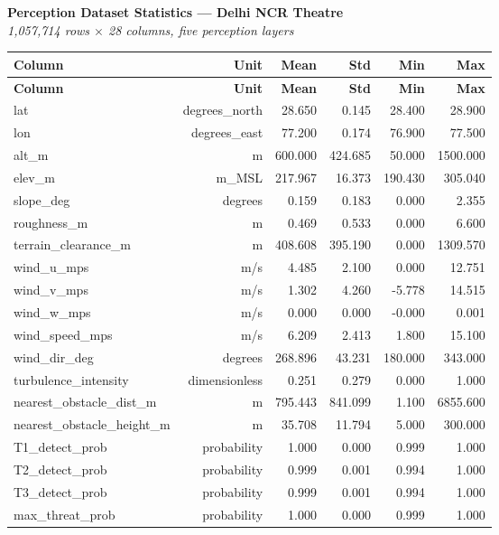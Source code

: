 \documentclass{article}
\begin{document}
\begin{center}
\textbf{Perception Dataset Statistics — Delhi NCR Theatre}\\
\textit{1,057,714 rows $\times$ 28 columns, five perception layers}
\end{center}

\begin{longtable}{lrrrrr}
\toprule
\textbf{Column} & \textbf{Unit} & \textbf{Mean} & \textbf{Std} & \textbf{Min} & \textbf{Max} \\
\midrule
\endfirsthead
\toprule
\textbf{Column} & \textbf{Unit} & \textbf{Mean} & \textbf{Std} & \textbf{Min} & \textbf{Max} \\
\midrule
\endhead
\bottomrule
\endfoot
lat & degrees_north & 28.650 & 0.145 & 28.400 & 28.900 \\
lon & degrees_east & 77.200 & 0.174 & 76.900 & 77.500 \\
alt\_m & m & 600.000 & 424.685 & 50.000 & 1500.000 \\
elev\_m & m_MSL & 217.967 & 16.373 & 190.430 & 305.040 \\
slope\_deg & degrees & 0.159 & 0.183 & 0.000 & 2.355 \\
roughness\_m & m & 0.469 & 0.533 & 0.000 & 6.600 \\
terrain\_clearance\_m & m & 408.608 & 395.190 & 0.000 & 1309.570 \\
wind\_u\_mps & m/s & 4.485 & 2.100 & 0.000 & 12.751 \\
wind\_v\_mps & m/s & 1.302 & 4.260 & -5.778 & 14.515 \\
wind\_w\_mps & m/s & 0.000 & 0.000 & -0.000 & 0.001 \\
wind\_speed\_mps & m/s & 6.209 & 2.413 & 1.800 & 15.100 \\
wind\_dir\_deg & degrees & 268.896 & 43.231 & 180.000 & 343.000 \\
turbulence\_intensity & dimensionless & 0.251 & 0.279 & 0.000 & 1.000 \\
nearest\_obstacle\_dist\_m & m & 795.443 & 841.099 & 1.100 & 6855.600 \\
nearest\_obstacle\_height\_m & m & 35.708 & 11.794 & 5.000 & 300.000 \\
T1\_detect\_prob & probability & 1.000 & 0.000 & 0.999 & 1.000 \\
T2\_detect\_prob & probability & 0.999 & 0.001 & 0.994 & 1.000 \\
T3\_detect\_prob & probability & 0.999 & 0.001 & 0.994 & 1.000 \\
max\_threat\_prob & probability & 1.000 & 0.000 & 0.999 & 1.000 \\

\end{longtable}
\end{document}

